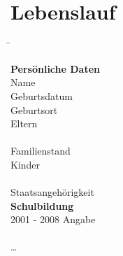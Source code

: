 \pagestyle{empty}
\section*{Lebenslauf}

\begin{tabbing}
\hspace*{4cm}\= \kill

\textbf{Persönliche Daten}              											\\[0.45em]%
Name									\>      								\\[0.45em]
Geburtsdatum					\> 											\\[0.45em]
Geburtsort						\> 										\\[0.45em]
Eltern								\> 									\\
											\> 	\\[0.45em]
Familienstand					\> 							\\[0.45em]
Kinder      					\> 						\\[0.45em]
            					\> 						\\[0.45em]

Staatsangehörigkeit		\> 															\\[1.5em]

\textbf{Schulbildung}																					\\[0.45em]%
2001 - 2008						\> Angabe				\\[0.5em]
																\\[1.5em]

\dots

\end{tabbing}





